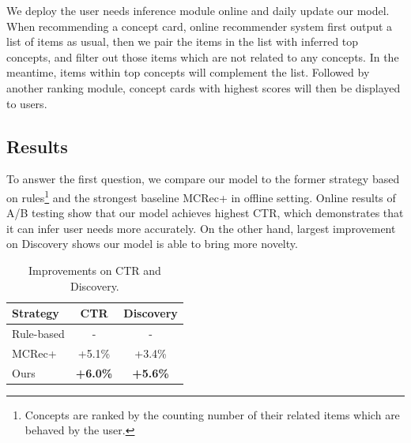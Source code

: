 We deploy the user needs inference module online 
and daily update our model.
When recommending a concept card, online recommender system first output a list of items as usual, 
then we pair the items in the list with inferred top concepts, and filter out those items which are not related to any concepts. In the meantime, items within top concepts will complement the list.
Followed by another ranking module, concept cards with highest scores will then be displayed to users.
\subsection{Results}

To answer the first question, we compare our model to the former strategy based on rules\footnote{Concepts are ranked by the counting number of their related items which are behaved by the user.} and the strongest baseline MCRec+ in offline setting.
Online results of A/B testing show that our model achieves highest CTR, 
which demonstrates that it can infer user needs more accurately. 
On the other hand, largest improvement on Discovery
shows our model is able to bring more novelty.

\begin{table}[th]
	\centering
	\begin{tabular}{l|c|c}
		\hline
		Strategy  & CTR   & Discovery\\
		\hline
		Rule-based  & - & - \\ 
		MCRec+  & +5.1\%   & +3.4\%\\
		Ours  & \textbf{+6.0\%} & \textbf{+5.6\%} \\

		\hline
	\end{tabular}
	\caption{Improvements on CTR and Discovery. }
	\label{tab:online}
\end{table}


